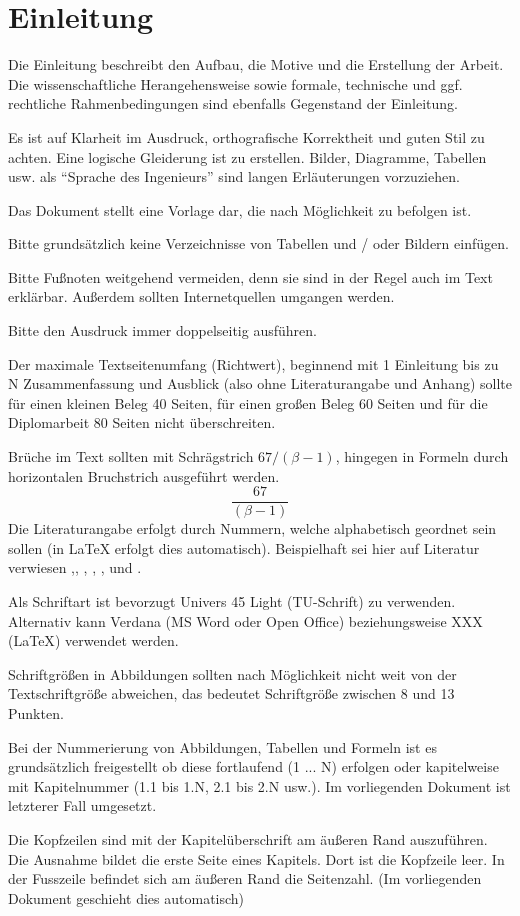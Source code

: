 \chapter{Einleitung}
\label{sec:Einleitung}

Die Einleitung beschreibt den Aufbau, die Motive und die Erstellung der Arbeit. Die wissenschaftliche Herangehensweise sowie formale, technische und ggf. rechtliche Rahmenbedingungen sind ebenfalls Gegenstand der Einleitung. \par
Es ist auf Klarheit im Ausdruck, orthografische Korrektheit und guten Stil zu achten. Eine logische Gleiderung ist zu erstellen. Bilder, Diagramme, Tabellen usw. als "`Sprache des Ingenieurs"' sind langen Erläuterungen vorzuziehen.\par
Das Dokument stellt eine Vorlage dar, die nach Möglichkeit zu befolgen ist. \par
Bitte grundsätzlich keine Verzeichnisse von Tabellen und / oder Bildern einfügen. \par
Bitte Fußnoten weitgehend vermeiden, denn sie sind in der Regel auch im Text erklärbar.
Außerdem sollten Internetquellen umgangen werden. \par
Bitte den Ausdruck immer doppelseitig ausführen. \par
Der maximale Textseitenumfang (Richtwert), beginnend mit 1 Einleitung bis zu N Zusammenfassung und Ausblick (also ohne Literaturangabe und Anhang) sollte für einen kleinen Beleg  40 Seiten, für einen großen Beleg  60 Seiten und für die  Diplomarbeit 80 Seiten nicht überschreiten. \par
Brüche im Text sollten mit Schrägstrich $67/(\beta -1)$, hingegen in Formeln durch horizontalen Bruchstrich ausgeführt werden.
	\[
	\frac{67}{(\beta -1)}
\]
Die Literaturangabe erfolgt durch Nummern, welche alphabetisch geordnet sein sollen (in {\LaTeX} erfolgt dies automatisch). Beispielhaft sei hier auf Literatur verwiesen \cite{Kallinderis2009},\cite{Mustermann2005}, \cite{Mustermann2004}, \cite{Mustermann2003}, \cite{Mustermann2002}, \cite{wwwMuster2001} und \cite{wwwMuster2000}.\par
Als Schriftart ist bevorzugt Univers 45 Light (TU-Schrift) zu verwenden. Alternativ kann Verdana (MS Word oder Open Office) beziehungsweise XXX ({\LaTeX}) verwendet werden. \par
Schriftgrößen in Abbildungen sollten nach Möglichkeit nicht weit von der Textschriftgröße abweichen, das bedeutet Schriftgröße zwischen 8 und 13 Punkten.\par
Bei der Nummerierung von Abbildungen, Tabellen und Formeln ist es grundsätzlich freigestellt ob diese fortlaufend (1 ... N) erfolgen oder kapitelweise mit Kapitelnummer (1.1 bis 1.N, 2.1 bis 2.N usw.). Im vorliegenden Dokument ist letzterer Fall umgesetzt.\par
Die Kopfzeilen sind mit der Kapitelüberschrift am äußeren Rand auszuführen. Die Ausnahme bildet die erste Seite eines Kapitels. Dort ist die Kopfzeile leer. In der Fusszeile befindet sich am äußeren Rand die Seitenzahl. (Im vorliegenden Dokument geschieht dies automatisch)

